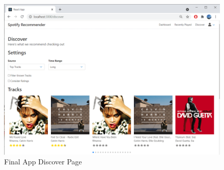\begin{figure}[bth]
    \centering
    \includegraphics[width=1.0\textwidth]{Graphics/Chapter1/AppDiscoverPage.png}
    \caption{Final App Discover Page}
\end{figure}
